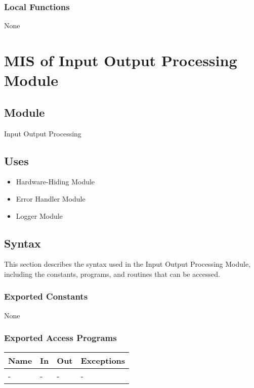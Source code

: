 \documentclass[12pt, titlepage]{article}
\begin{document}
\subsubsection{Local Functions}

None

\newpage

\section{MIS of Input Output Processing Module} \label{MIS_IO}

\subsection{Module}

Input Output Processing

\subsection{Uses}

\begin{itemize}
\item Hardware-Hiding Module
\item Error Handler Module
\item Logger Module
\end{itemize}

\subsection{Syntax}

This section describes the syntax used in the Input Output Processing Module,
including the constants, programs, and routines that can be accessed.

\subsubsection{Exported Constants}

None

\subsubsection{Exported Access Programs}

\begin{center}
\begin{tabular}{p{2cm} p{4cm} p{4cm} p{2cm}}
\hline
\textbf{Name} & \textbf{In} & \textbf{Out} & \textbf{Exceptions} \\
\hline
- & - & - & - \\
\hline
\end{tabular}
\end{center}
\end{document}
